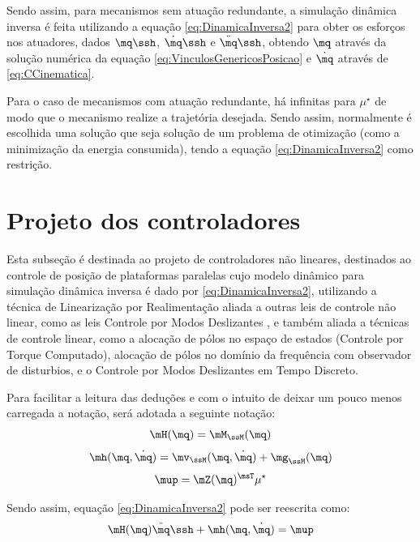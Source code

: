 \documentclass[]{politex}
\begin{document}
Sendo assim, para mecanismos sem atuação redundante, a simulação dinâmica inversa é feita utilizando a equação \eqref{eq:DinamicaInversa2} para obter os esforços nos atuadores, dados $\mq\ssh$, $\dot{\mq}\ssh$ e $\ddot{\mq}\ssh$, obtendo $\mq$ através da solução numérica da equação \eqref{eq:VinculosGenericosPosicao} e $\dot{\mq}$ através de \eqref{eq:CCinematica}. 

Para o caso de mecanismos com atuação redundante, há infinitas para $\mu^\star$ de modo que o mecanismo realize a trajetória desejada. Sendo assim, normalmente é escolhida uma solução que seja solução de um problema de otimização (como a minimização da energia consumida), tendo a equação \eqref{eq:DinamicaInversa2} como restrição.


\chapter{Projeto dos controladores}

Esta subseção é destinada ao projeto de controladores não lineares, destinados ao controle de posição de plataformas paralelas cujo modelo dinâmico para simulação dinâmica inversa é dado por \eqref{eq:DinamicaInversa2}, utilizando a técnica de Linearização por Realimentação aliada a outras leis de controle não linear, como as leis Controle por Modos Deslizantes \cite{Slotini, Utkin}, e também aliada a técnicas de controle linear, como a alocação de pólos no espaço de estados (Controle por Torque Computado), alocação de pólos no domínio da frequência com observador de disturbios, e o Controle por Modos Deslizantes em Tempo Discreto.

Para facilitar a leitura das deduções e com o intuito de deixar um pouco menos carregada a notação, será adotada a seguinte notação:
\begin{equation}
\mH(\mq) = \mM_{\ssM}(\mq)
\end{equation}
\begin{equation}
\mh(\mq, \dot{\mq}) = \mv_{\ssM}(\mq, \dot{\mq}) + \mg_{\ssM}(\mq)
\end{equation}
\begin{equation}
\mup = \mZ(\mq)^{\msT} \mu^\star
\end{equation}

Sendo assim, equação \eqref{eq:DinamicaInversa2} pode ser reescrita como:
\begin{equation} \label{eq:ModeloControle}
\mH(\mq)  \ddot{\mq}\ssh + \mh(\mq,\dot{\mq}) = \mup
\end{equation}
\end{document}

